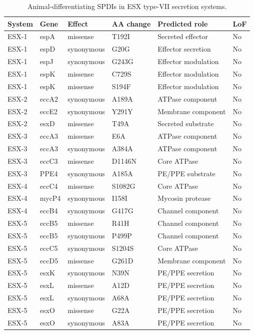 \documentclass[11pt,a4paper]{article}
\begin{document}
\begin{table}[h!]
\centering
\caption{Animal-differentiating SPDIs in ESX type-VII secretion systems.}
\label{tab:esx}
\begin{tabular}{llllll}
\toprule
System & Gene & Effect & AA change & Predicted role & LoF \\
\midrule
ESX-1 & espA  & missense  & T192I & Secreted effector & No \\
ESX-1 & espD  & synonymous & G20G  & Effector secretion & No \\
ESX-1 & espJ  & synonymous & G243G & Effector modulation & No \\
ESX-1 & espK  & missense  & C729S & Effector modulation & No \\
ESX-1 & espK  & missense  & S194F & Effector modulation & No \\
\midrule
ESX-2 & eccA2 & synonymous & A189A & ATPase component & No \\
ESX-2 & eccE2 & synonymous & Y291Y & Membrane component & No \\
ESX-2 & esxD  & missense  & T49A  & Secreted substrate  & No \\
\midrule
ESX-3 & eccA3 & missense  & E6A   & ATPase component & No \\
ESX-3 & eccA3 & synonymous & A384A & ATPase component & No \\
ESX-3 & eccC3 & missense  & D1146N & Core ATPase & No \\
ESX-3 & PPE4  & synonymous & A185A & PE/PPE substrate & No \\
\midrule
ESX-4 & eccC4 & missense  & S1082G & Core ATPase & No \\
ESX-4 & mycP4 & synonymous & I158I & Mycosin protease & No \\
ESX-4 & eccB4 & synonymous & G417G & Channel component & No \\
\midrule
ESX-5 & eccB5 & missense  & R41H  & Channel component & No \\
ESX-5 & eccB5 & synonymous & P499P & Channel component & No \\
ESX-5 & eccC5 & synonymous & S1204S & Core ATPase & No \\
ESX-5 & eccD5 & missense  & G261D & Membrane component & No \\
ESX-5 & esxK  & synonymous & N39N  & PE/PPE secretion & No \\
ESX-5 & esxL  & missense  & A12D  & PE/PPE secretion & No \\
ESX-5 & esxL  & synonymous & A68A  & PE/PPE secretion & No \\
ESX-5 & esxO  & missense  & G22A  & PE/PPE secretion & No \\
ESX-5 & esxO  & synonymous & A83A  & PE/PPE secretion & No \\
\bottomrule
\end{tabular}
\end{table}
\end{document}
